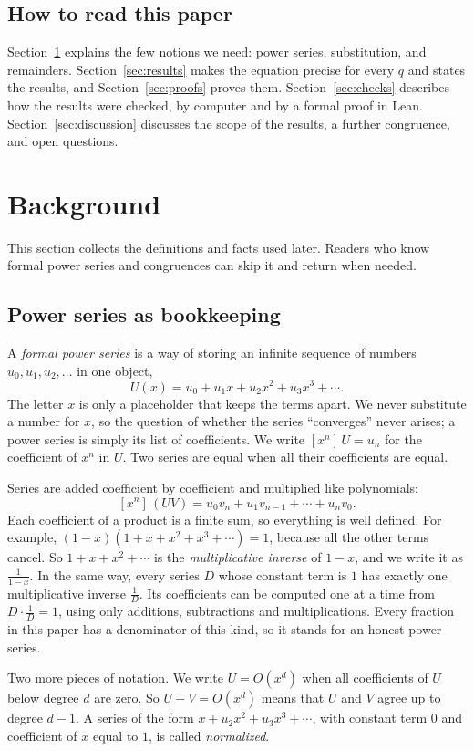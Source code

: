 \documentclass[11pt,a4paper]{article}
\theoremstyle{definition}
\theoremstyle{remark}
\newcommand{\coeff}[2]{[x^{#1}]\,#2}
\begin{document}
\subsection{How to read this paper}
Section~\ref{sec:background} explains the few notions we need: power series, substitution, and remainders.
Section~\ref{sec:results} makes the equation precise for every $q$ and states the results, and
Section~\ref{sec:proofs} proves them. Section~\ref{sec:checks} describes how the results were checked, by computer
and by a formal proof in Lean. Section~\ref{sec:discussion} discusses the scope of the results, a further congruence,
and open questions.
\section{Background}\label{sec:background}
This section collects the definitions and facts used later. Readers who know formal power series and congruences can skip it and return when needed.
\subsection{Power series as bookkeeping}
A \emph{formal power series} is a way of storing an infinite sequence of numbers $u_0,u_1,u_2,\dots$ in one object,
\[
U(x)=u_0+u_1x+u_2x^2+u_3x^3+\cdots .
\]
The letter $x$ is only a placeholder that keeps the terms apart. We never substitute a number for $x$, so the question
of whether the series ``converges'' never arises; a power series is simply its list of coefficients. We write
$\coeff{n}{U}=u_n$ for the coefficient of $x^n$ in $U$. Two series are equal when all their coefficients are equal.

Series are added coefficient by coefficient and multiplied like polynomials:
\[
\coeff{n}{(UV)}=u_0v_n+u_1v_{n-1}+\cdots+u_nv_0 .
\]
Each coefficient of a product is a finite sum, so everything is well defined. For example,
$(1-x)(1+x+x^2+x^3+\cdots)=1$, because all the other terms cancel. So $1+x+x^2+\cdots$ is the
\emph{multiplicative inverse} of $1-x$, and we write it as $\frac{1}{1-x}$. In the same way, every series $D$ whose
constant term is $1$ has exactly one multiplicative inverse $\frac1D$. Its coefficients can be computed one at a time
from $D\cdot\frac1D=1$, using only additions, subtractions and multiplications. Every fraction in this paper has a
denominator of this kind, so it stands for an honest power series.

Two more pieces of notation. We write $U=O(x^d)$ when all coefficients of $U$ below degree $d$ are zero. So
$U-V=O(x^d)$ means that $U$ and $V$ agree up to degree $d-1$. A series of the form $x+u_2x^2+u_3x^3+\cdots$, with
constant term $0$ and coefficient of $x$ equal to $1$, is called \emph{normalized}.
\end{document}
